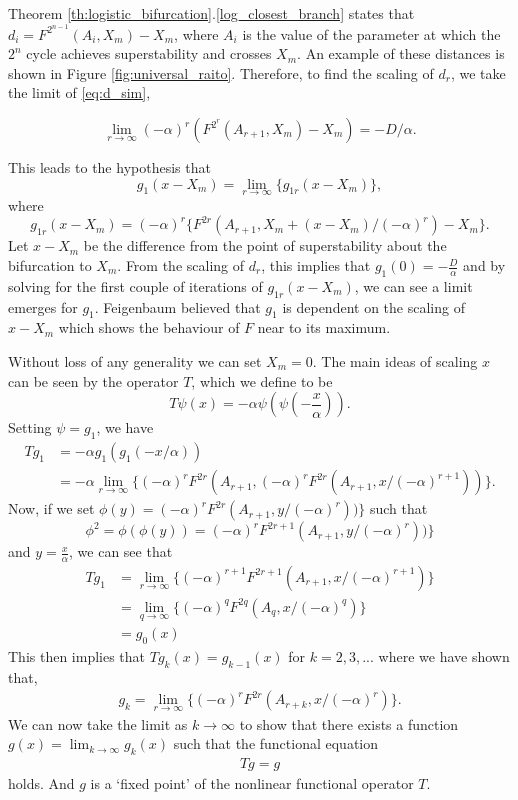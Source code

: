 Theorem \ref{th:logistic_bifurcation}.\ref{log_closest_branch} states that $d_i = F^{2^{n-1}}(A_i, X_m) - X_m$, where $A_i$ is the value of the parameter at which the $2^n$ cycle achieves superstability and crosses $X_m$. An example of these distances is shown in Figure \ref{fig:universal_raito}.
Therefore, to find the scaling of $d_r$, we take the limit of \eqref{eq:d_sim},

\begin{equation}
\lim_{r \to \infty} (-\alpha)^r \left(F^{2^r}(A_{r+1}, X_m) - X_m\right) = - D/\alpha.
\end{equation}

This leads to the hypothesis that
$$
g_1(x-X_m)=\lim_{r \to \infty} \{g_{1r}(x-X_m)\},
$$
where
$$
g_{1r}(x-X_m) = (-\alpha)^r \{F^{2r}(A_{r+1}, X_m + (x-X_m)/(-\alpha)^r)-X_m\}.
$$
Let $x-X_m$ be the difference from the point of superstability about the bifurcation to $X_m$. 
From the scaling of $d_r$, this implies that $g_1(0)=-\frac{D}{\alpha}$ and by solving for the first couple of iterations of $g_{1r}(x-X_m)$, we can see a limit emerges for $g_1$.
Feigenbaum believed that $g_1$ is dependent on the scaling of $x-X_m$ which shows the behaviour of $F$ near to its maximum. 

Without loss of any generality we can set $X_m=0$.
The main ideas of scaling $x$ can be seen by the operator $T$, which we define to be
\begin{equation} \label{eq: operator T}
T\psi(x)=-\alpha \psi (\psi(-\frac{x}{\alpha})).
\end{equation}
Setting $\psi=g_1$, we have
\begin{align}
    Tg_1 &=-\alpha g_1(g_1(-x/\alpha)) \nonumber \\
    &= -\alpha \lim_{r \to \infty} \{(-\alpha)^rF^{2r}(A_{r+1}, (-\alpha)^rF^{2r}(A_{r+1},x/(-\alpha)^{r+1}))\}.  \label{eq:one}
\end{align}
Now, if we set $\phi(y)=(-\alpha)^rF^{2r}(A_{r+1},y/(-\alpha)^r))\}$ such that $$\phi^2=\phi(\phi(y))=(-\alpha)^rF^{2r+1}(A_{r+1},y/(-\alpha)^r))\}$$ and $y=\frac{x}{\alpha}$, we can see that
\begin{align*}
    Tg_1 &= \lim_{r \to \infty} \{(-\alpha)^{r+1}F^{2r+1}(A_{r+1}, x/(-\alpha)^{r+1})\} \\
    &= \lim_{q \to \infty} \{(-\alpha)^qF^{2q}(A_q,x/(-\alpha)^q)\} \\
    &= g_0(x)
\end{align*}
This then implies that $Tg_k(x)=g_{k-1}(x)$ for $k = 2,3,...$ where we have shown that,
\begin{align}
    g_k=\lim_{r \to \infty} \{(-\alpha)^{r}F^{2r}(A_{r+k}, x/(-\alpha)^{r})\}. \label{eq:two}
\end{align} 
We can now take the limit as $k \to \infty$ to show that there exists a function $g(x)= \lim_{k \to \infty}g_k(x)$ such that  the functional equation
\begin{align}
    Tg=g \label{eq:FunctionalOperator}
\end{align}
holds. 
And $g$ is a `fixed point' of the nonlinear functional operator $T$.

